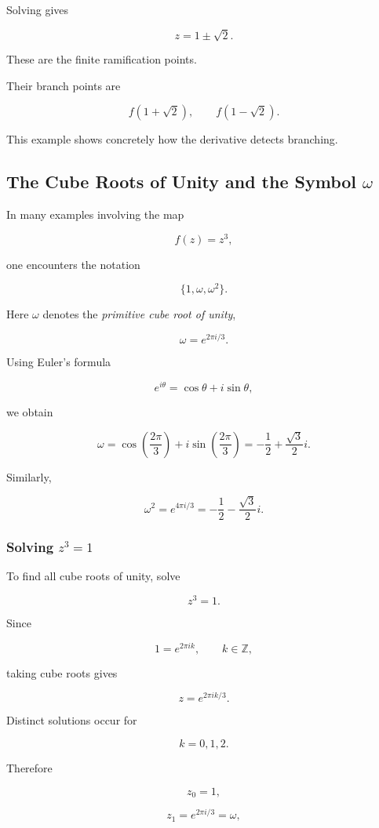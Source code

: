 \documentclass[12pt,a4paper]{article}
\theoremstyle{notespace}
\begin{document}
Solving gives

\[
z=1\pm\sqrt2.
\]

These are the finite ramification points.

Their branch points are

\[
f(1+\sqrt2),
\qquad
f(1-\sqrt2).
\]

This example shows concretely how the derivative detects branching.

\subsection{The Cube Roots of Unity and the Symbol \(\omega\)}

In many examples involving the map

\[
f(z)=z^3,
\]

one encounters the notation

\[
\{1,\omega,\omega^2\}.
\]

Here \(\omega\) denotes the \emph{primitive cube root of unity},

\[
\omega=e^{2\pi i/3}.
\]

Using Euler's formula

\[
e^{i\theta}
=
\cos\theta+i\sin\theta,
\]

we obtain

\[
\omega
=
\cos\left(\frac{2\pi}{3}\right)
+
i\sin\left(\frac{2\pi}{3}\right)
=
-\frac12+\frac{\sqrt3}{2}i.
\]

Similarly,

\[
\omega^2
=
e^{4\pi i/3}
=
-\frac12-\frac{\sqrt3}{2}i.
\]

\subsubsection{Solving \(z^3=1\)}

To find all cube roots of unity, solve

\[
z^3=1.
\]

Since

\[
1=e^{2\pi i k},
\qquad k\in\mathbb Z,
\]

taking cube roots gives

\[
z=e^{2\pi i k/3}.
\]

Distinct solutions occur for

\[
k=0,1,2.
\]

Therefore

\[
z_0=1,
\]

\[
z_1=e^{2\pi i/3}=\omega,
\]
\end{document}
